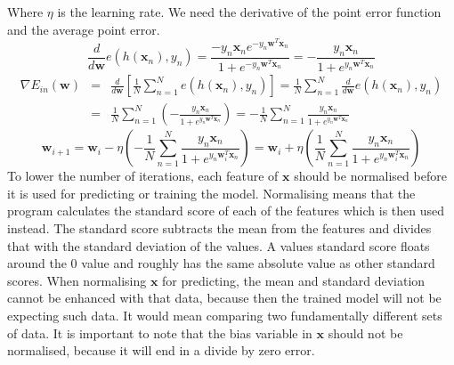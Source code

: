 Where $\eta$ is the learning rate. We need the derivative of the point error function and the average point error.
\[ \frac{d}{d \mathbf{w}} e \left( h \left( \mathbf{x}_n \right), y_n \right) = \frac{-y_n \mathbf{x}_n e^{-y_n \mathbf{w}^T \mathbf{x}_n}}{1 + e^{-y_n \mathbf{w}^T \mathbf{x}_n}} = -\frac{y_n \mathbf{x}_n}{1 + e^{y_n \mathbf{w}^T \mathbf{x}_n}} \]
\begin{eqnarray*}
\nabla E_{in} \left( \mathbf{w} \right) & = & \frac{d}{d \mathbf{w}} \left[ \frac{1}{N} \sum_{n=1}^N e \left( h \left( \mathbf{x}_n \right), y_n \right) \right] = \frac{1}{N} \sum_{n=1}^N \frac{d}{d \mathbf{w}} e \left( h \left( \mathbf{x}_n \right), y_n \right) \\
& = & \frac{1}{N} \sum_{n=1}^N \left( -\frac{y_n \mathbf{x}_n}{1 + e^{y_n \mathbf{w}^T \mathbf{x}_n}} \right) = - \frac{1}{N} \sum_{n=1}^N \frac{y_n \mathbf{x}_n}{1 + e^{y_n \mathbf{w}^T \mathbf{x}_n}}
\end{eqnarray*}
\[ \mathbf{w}_{i+1} = \mathbf{w}_i - \eta \left( -\frac{1}{N} \sum_{n=1}^N \frac{y_n \mathbf{x}_n}{1 + e^{y_n \mathbf{w}_i^T \mathbf{x}_n}} \right) = \mathbf{w}_i + \eta \left( \frac{1}{N} \sum_{n=1}^N \frac{y_n \mathbf{x}_n}{1 + e^{y_n \mathbf{w}_i^T \mathbf{x}_n}} \right) \]
To lower the number of iterations, each feature of $\mathbf{x}$ should be
normalised before it is used for predicting or training the model. Normalising
means that the program calculates the standard score of each of the features
which is then used instead. The standard score subtracts the mean from the
features and divides that with the standard deviation of the values. A values
standard score floats around the 0 value and roughly has the same absolute value
as other standard scores. When normalising $\mathbf{x}$ for predicting, the mean
and standard deviation cannot be enhanced with that data, because then the
trained model will not be expecting such data. It would mean comparing two
fundamentally different sets of data. It is important to note that the bias
variable in $\mathbf{x}$ should not be normalised, because it will end in a
divide by zero error.\cite{website:normalisation}

